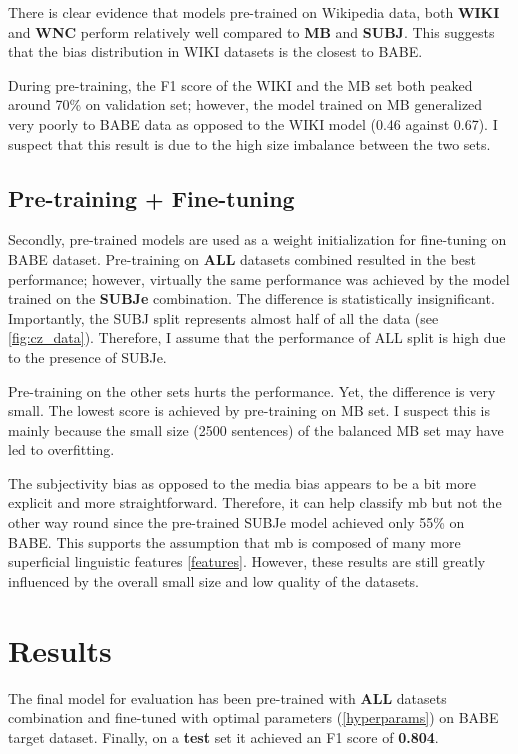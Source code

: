 There is clear evidence that models pre-trained on Wikipedia data, both \textbf{WIKI} and \textbf{WNC} perform relatively well compared to \textbf{MB} and \textbf{SUBJ}. This suggests that the bias distribution in WIKI datasets is the closest to BABE.

During pre-training, the F1 score of the WIKI and the MB set both peaked around 70\% on validation set; however, the model trained on MB generalized very poorly to BABE data as opposed to the WIKI model (0.46 against 0.67). I suspect that this result is due to the high size imbalance between the two sets.


\subsection{Pre-training + Fine-tuning}
Secondly, pre-trained models are used as a weight initialization for fine-tuning on BABE dataset.
Pre-training on \textbf{ALL} datasets combined resulted in the best performance; however, virtually the same performance was achieved by the model trained on the \textbf{SUBJe} combination. The difference is statistically insignificant. Importantly, the SUBJ split represents almost half of all the data (see \ref{fig:cz_data}). Therefore, I assume that the performance of ALL split is high due to the presence of SUBJe.

Pre-training on the other sets hurts the performance. Yet, the difference is very small. The lowest score is achieved by pre-training on MB set. I suspect this is mainly because the small size (2500 sentences) of the balanced MB set may have led to overfitting.


The subjectivity bias as opposed to the media bias appears to be a bit more explicit and more straightforward. Therefore, it can help classify \gls{mb} but not the other way round since the pre-trained SUBJe model achieved only 55\% on BABE. This supports the assumption that \gls{mb} is composed of many more superficial linguistic features \ref{features}. However, these results are still greatly influenced by the overall small size and low quality of the datasets.




\section{Results}
The final model for evaluation has been pre-trained with \textbf{ALL} datasets combination and fine-tuned with optimal parameters (\ref{hyperparams}) on BABE target dataset. Finally, on a \textbf{test} set it achieved an F1 score of \textbf{0.804}. 

